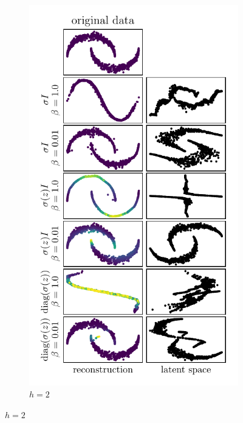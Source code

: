 \begin{figure}
\begin{subfigure}[b]{0.45\textwidth}
        \includegraphics[scale=0.9]{data/chapter_survey/vae_two_moons_z2_colored}
        \caption{$h=2$}
    \end{subfigure}

\end{figure}
